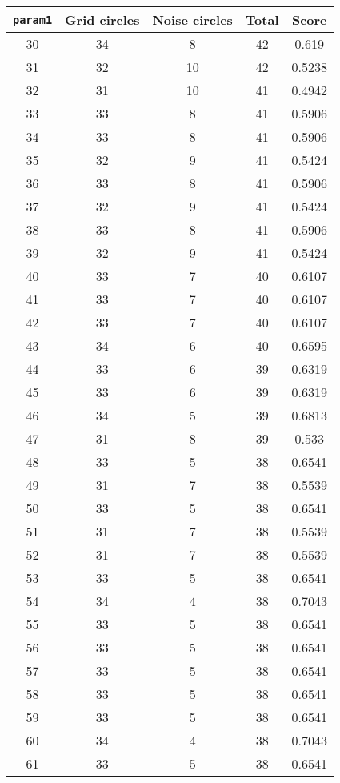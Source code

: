 \documentclass[letterpaper, 12pt]{article}
\begin{document}
\begin{longtable}{|c|c|c|c|c|}
\hline
\textbf{\texttt{param1}} & \textbf{Grid circles} & \textbf{Noise circles} & \textbf{Total} & \textbf{Score} \\
\hline
30 & 34 & 8 & 42 & 0.619 \\
\hline
31 & 32 & 10 & 42 & 0.5238 \\
\hline
32 & 31 & 10 & 41 & 0.4942 \\
\hline
33 & 33 & 8 & 41 & 0.5906 \\
\hline
34 & 33 & 8 & 41 & 0.5906 \\
\hline
35 & 32 & 9 & 41 & 0.5424 \\
\hline
36 & 33 & 8 & 41 & 0.5906 \\
\hline
37 & 32 & 9 & 41 & 0.5424 \\
\hline
38 & 33 & 8 & 41 & 0.5906 \\
\hline
39 & 32 & 9 & 41 & 0.5424 \\
\hline
40 & 33 & 7 & 40 & 0.6107 \\
\hline
41 & 33 & 7 & 40 & 0.6107 \\
\hline
42 & 33 & 7 & 40 & 0.6107 \\
\hline
43 & 34 & 6 & 40 & 0.6595 \\
\hline
44 & 33 & 6 & 39 & 0.6319 \\
\hline
45 & 33 & 6 & 39 & 0.6319 \\
\hline
46 & 34 & 5 & 39 & 0.6813 \\
\hline
47 & 31 & 8 & 39 & 0.533 \\
\hline
48 & 33 & 5 & 38 & 0.6541 \\
\hline
49 & 31 & 7 & 38 & 0.5539 \\
\hline
50 & 33 & 5 & 38 & 0.6541 \\
\hline
51 & 31 & 7 & 38 & 0.5539 \\
\hline
52 & 31 & 7 & 38 & 0.5539 \\
\hline
53 & 33 & 5 & 38 & 0.6541 \\
\hline
54 & 34 & 4 & 38 & 0.7043 \\
\hline
55 & 33 & 5 & 38 & 0.6541 \\
\hline
56 & 33 & 5 & 38 & 0.6541 \\
\hline
57 & 33 & 5 & 38 & 0.6541 \\
\hline
58 & 33 & 5 & 38 & 0.6541 \\
\hline
59 & 33 & 5 & 38 & 0.6541 \\
\hline
60 & 34 & 4 & 38 & 0.7043 \\
\hline
61 & 33 & 5 & 38 & 0.6541 \\

\end{longtable}
\end{document}
